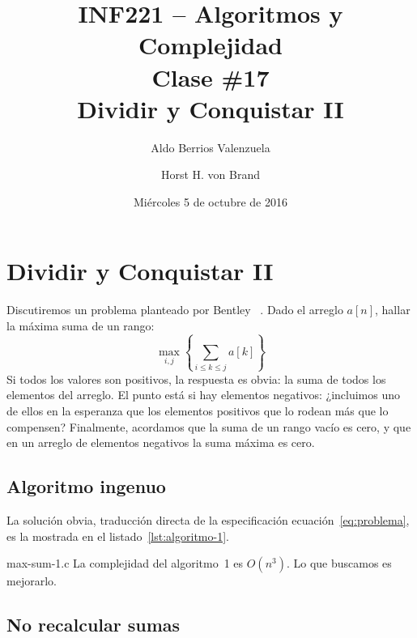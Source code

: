 \documentclass[english, spanish, fleqn, 10pt]{article}
\author{Aldo Berrios Valenzuela \and Horst H. von Brand}
\title{INF221 -- Algoritmos y Complejidad\\[.4\baselineskip]Clase \#17\\Dividir y Conquistar II}
\date{Miércoles 5 de octubre de 2016}
\numberwithin{equation}{section}
\newcommand{\nparentesis}[1]{\left( #1 \right)}
\newcommand{\ncorchetes}[1]{\left[ #1 \right]}
\theoremstyle{definition}
\begin{document}

\maketitle
\lstset{language=[ANSI]C,
	basicstyle=\ttfamily\small, commentstyle=\slshape,
	extendedchars, frame=lines, numbers=none,
	float, floatplacement=ht, captionpos=b,
	xleftmargin=1em, xrightmargin=1em
       }

\renewcommand{\lstlistingname}{Listado}


\section{Dividir y Conquistar II}

  Discutiremos un problema planteado por Bentley~%
    \cite{bentley84:_algorithm_design_techn}.
Dado el arreglo $a\ncorchetes{n}$, hallar la máxima suma de un rango:
\begin{equation}
  \label{eq:problema}
  \max_{i, j} \left\{ \sum_{i \le k \le j} a[k] \right\}
\end{equation}
  Si todos los valores son positivos,
  la respuesta es obvia:
  la suma de todos los elementos del arreglo.
  El punto está si hay elementos negativos:
  ¿incluimos uno de ellos
  en la esperanza que los elementos positivos que lo rodean
  más que lo compensen?
  Finalmente,
  acordamos que la suma de un rango vacío es cero,
  y que en un arreglo de elementos negativos la suma máxima es cero.
  
\subsection{Algoritmo ingenuo}
\label{sec:algoritmo-1}

  La solución obvia,
  traducción directa de la especificación
  ecuación~\eqref{eq:problema},
  es la mostrada en el listado~\ref{lst:algoritmo-1}.
  
                  {max-sum-1.c}
La complejidad del algoritmo~1 es $O\nparentesis{n^3}$. Lo que buscamos es mejorarlo. 

\subsection{No recalcular sumas}
\label{sec:no-recalcular-sumas}
\end{document}
